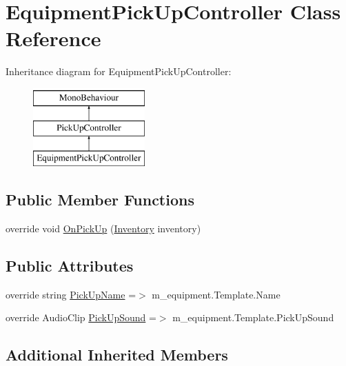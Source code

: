 \hypertarget{class_equipment_pick_up_controller}{}\section{Equipment\+Pick\+Up\+Controller Class Reference}
\label{class_equipment_pick_up_controller}
Inheritance diagram for Equipment\+Pick\+Up\+Controller\+:\begin{figure}[H]
\begin{center}
\leavevmode
\includegraphics[height=3.000000cm]{class_equipment_pick_up_controller}
\end{center}
\end{figure}
\subsection*{Public Member Functions}
\begin{DoxyCompactItemize}
\item 
override void \mbox{\hyperlink{class_equipment_pick_up_controller_a010896ed927665505e88ce51d8f4067c}{On\+Pick\+Up}} (\mbox{\hyperlink{class_inventory}{Inventory}} inventory)
\end{DoxyCompactItemize}
\subsection*{Public Attributes}
\begin{DoxyCompactItemize}
\item 
override string \mbox{\hyperlink{class_equipment_pick_up_controller_a46f64df4258fc8189cf9faa5582f92b3}{Pick\+Up\+Name}} =$>$ m\+\_\+equipment.\+Template.\+Name
\item 
override Audio\+Clip \mbox{\hyperlink{class_equipment_pick_up_controller_ac357fb5a6f6604926aaa3d7b9aa2c291}{Pick\+Up\+Sound}} =$>$ m\+\_\+equipment.\+Template.\+Pick\+Up\+Sound
\end{DoxyCompactItemize}
\subsection*{Additional Inherited Members}


